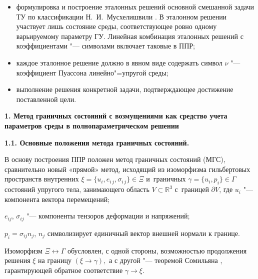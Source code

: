 \begin{itemize}

\item[1)] формулировка и построение эталонных решений основной смешанной задачи ТУ по классификации Н.~И.~Мусхелишвили \cite{Novi_bib2}. В эталонном решении участвует лишь состояние среды, соответствующее ровно одному варьируемому параметру ГУ. Линейная комбинация эталонных решений с коэффициентами "--- символами включает таковые в ППР;



\item[2)] каждое эталонное решение должно в явном виде содержать символ $\nu$ "--- коэффициент Пуассона линейно"=упругой среды;



\item[3)] выполнение решения конкретной задачи, подтверждающее достижение поставленной цели.



\end{itemize}





{\bf 1. Метод граничных состояний с возмущениями как средство учета параметров среды в полнопараметрическом решении}



\smallskip



\textbf{1.1. Основные положения метода граничных состояний.} 

В основу построения ППР положен метод граничных состояний (МГС), сравнительно новый «прямой» метод, исходящий из изоморфизма гильбертовых пространств внутренних $\xi =\{ u_{i} ,  e _{i\, j} ,\sigma _{i\, j} \} \in \Xi $ и~граничных $\gamma =\{ u_{i} ,p_{i} \} \in \Gamma $ состояний упругого тела, занимающего область $V\subset {\mathbb R^3} $ с~границей $\partial V$, где $u_{i} $ "--- компонента вектора перемещений;

$ e _{ij} $, $\sigma _{i j} $ "--- компоненты тензоров деформации и напряжений; 

$p_{i} =\sigma _{i j}  n_{j} $, $n_{j} $  символизирует единичный вектор внешней нормали к границе. 

Изоморфизм $\Xi \leftrightarrow \Gamma $ обусловлен, с одной стороны, возможностью продолжения решения $\xi $ на границу $(\xi \to \gamma ),$ а с другой "--- теоремой Сомильяна \cite{Novi_bib3}, гарантирующей обратное соответствие $\gamma \to \xi $.  

